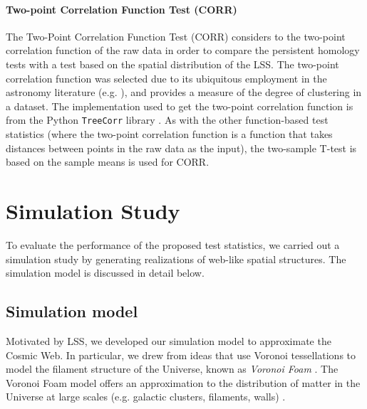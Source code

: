 \documentclass[12pt]{article}
\begin{document}
\paragraph{Two-point Correlation Function Test (CORR)} 
The Two-Point Correlation Function Test (CORR) considers to the two-point correlation function of the raw data in order to compare the persistent homology tests with a test based on the spatial distribution of the LSS.  The two-point correlation function was selected due to its ubiquitous employment in the astronomy literature (e.g. \citealt{Baugh:2006aa, Sanchez:2012aa}), and provides a measure of the degree of clustering in a dataset.   
The implementation used to get the two-point correlation function is from the Python {\tt TreeCorr} library \citep{jarvis2004skewness, Jarvis:2015aa}. 
As with the other function-based test statistics (where the two-point correlation function is a function that takes distances between points in the raw data as the input), the two-sample T-test is based on the sample means is used for CORR.






\section{Simulation Study}
\label{sec:simulation}

To evaluate the performance of the proposed test statistics, we carried out a simulation study by generating realizations of web-like spatial structures.  The simulation model is discussed in detail below.

\subsection{Simulation model} \label{sec:sim_model} %
Motivated by LSS, we developed our simulation model to approximate the Cosmic Web. In particular, we drew from ideas that use Voronoi tessellations to model the filament structure of the Universe, known as \emph{Voronoi Foam} \citep{icke1987fragmenting, icke1991galaxy, van2007voronoi}.  The Voronoi Foam model offers an approximation to the distribution of matter in the Universe at large scales (e.g. galactic clusters, filaments, walls) \citep{icke1991galaxy}.
\end{document}
